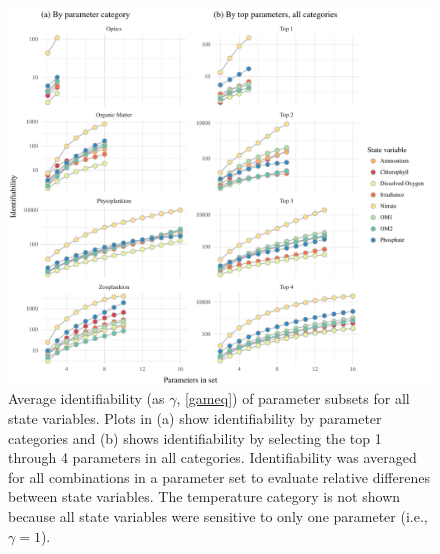 \documentclass[letterpaper,12pt,oneside]{article}\usepackage[]{graphicx}\usepackage[]{color}
\makeatletter
\def\maxwidth{ %
  \ifdim\Gin@nat@width>\linewidth
    \linewidth
  \else
    \Gin@nat@width
  \fi
}
\makeatother
\begin{document}
\begin{figure}[!ht]

{\centering \includegraphics[width=\maxwidth]{figs/identploall-1} 

}

\caption[Average identifiability (as $\gamma$, \cref{gameq}) of parameter subsets for all state variables]{Average identifiability (as $\gamma$, \cref{gameq}) of parameter subsets for all state variables.  Plots in (a) show identifiability by parameter categories and (b) shows identifiability by selecting the top 1 through 4 parameters in all categories.  Identifiability was averaged for all combinations in a parameter set to evaluate relative differenes between state variables.  The temperature category is not shown because all state variables were sensitive to only one parameter (i.e., $\gamma = 1$).}\label{fig:identploall}
\end{figure}
\end{document}
